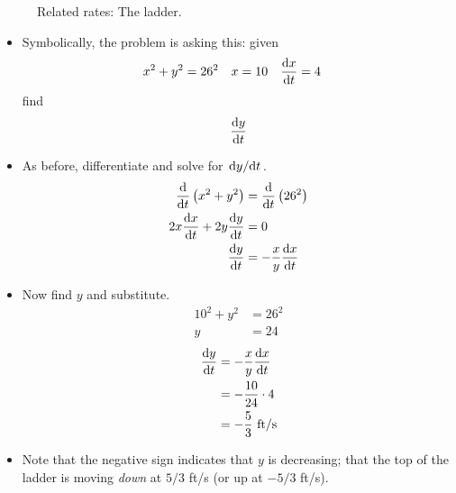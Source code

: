 \documentclass[../main.tex]{subfiles}
\begin{document}
\begin{itemize}
\begin{figure}[h!]
        \caption{Related rates: The ladder.}
        \label{fig:relatedrates-ladder}
    \end{figure}
    \begin{itemize}
        \item Symbolically, the problem is asking this: given
        \begin{align*}
            x^2+y^2 &= 26^2&
            x &= 10&
            \dv{x}{t} &= 4
        \end{align*}
        find
        \begin{equation*}
            \dv{y}{t}
        \end{equation*}
        \item As before, differentiate and solve for $\dv*{y}{t}$.
        \begin{align*}
            \dv{t}\left( x^2+y^2 \right) &= \dv{t}\left( 26^2 \right)\\
            2x\dv{x}{t}+2y\dv{y}{t} &= 0\\
            \dv{y}{t} &= -\frac{x}{y}\dv{x}{t}
        \end{align*}
        \item Now find $y$ and substitute.
        \begin{align*}
            10^2+y^2 &= 26^2\\
            y &= 24
        \end{align*}
        \begin{align*}
            \dv{y}{t} &= -\frac{x}{y}\dv{x}{t}\\
            &= -\frac{10}{24}\cdot 4\\
            &= -\frac{5}{3}\text{ ft/s}
        \end{align*}
        \item Note that the negative sign indicates that $y$ is decreasing; that the top of the ladder is moving \emph{down} at $5/3$ ft/s (or up at $-5/3$ ft/s).

\end{itemize}
\end{itemize}
\end{document}
